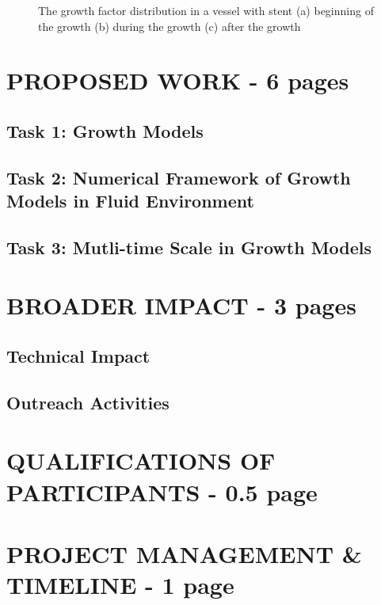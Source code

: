 \documentclass[12pt]{article}
\begin{document}
\begin{figure}[H]
\begin{subfigure}
		\label{fig:step15}
	\end{subfigure}
	\caption{The growth factor distribution in a vessel with stent (a) beginning of the growth (b) during the growth (c) after the growth}
	\label{fig:growth_stent}
\end{figure}

\section{PROPOSED WORK - 6 pages}

\subsection{Task 1: Growth Models}


\subsection{Task 2: Numerical Framework of Growth Models in Fluid Environment}


\subsection{Task 3: Mutli-time Scale in Growth Models}


\section{BROADER IMPACT - 3 pages}

\subsection{Technical Impact}

\subsection{Outreach Activities}


\section{QUALIFICATIONS OF PARTICIPANTS - 0.5 page}

\section{PROJECT MANAGEMENT \& TIMELINE - 1 page}
\end{document}
